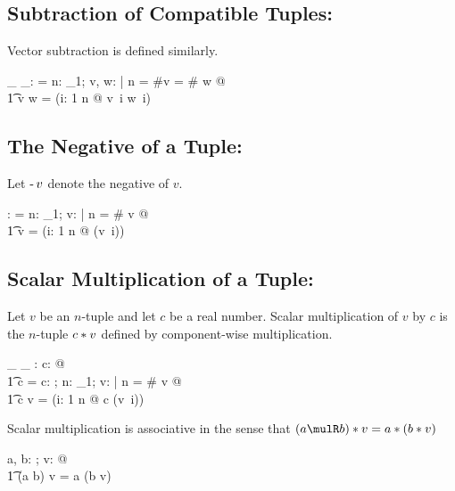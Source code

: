 \documentclass{amsart}
\begin{document}
\subsection{Subtraction of Compatible Tuples: }

Vector subtraction is defined similarly.

\begin{axdef}
	\_ \subRinf \_: \RinfDelta \fun \Rinf
\where
	\langle \rangle \subRinf \langle \rangle = \langle \rangle
\also
\forall n: \nat_1; v, w: \Rinf | n = \#v = \# w @ \\
\t1	v \subRinf w = (\lambda i: 1 \upto n @ v~i \subR w~i)
\end{axdef}

\subsection{The Negative of a Tuple: }

Let $\operatorname{-} v$ denote the negative of $v$.

\begin{axdef}
\negRinf: \Rinf \fun \Rinf
\where
\negRinf \langle \rangle = \langle \rangle
\also
\forall n: \nat_1; v: \Rinf | n = \# v @ \\
\t1	\negRinf v = (\lambda i: 1 \upto n @ \negR(v~i))
\end{axdef}

\subsection{Scalar Multiplication of a Tuple: }

Let $v$ be an $n$-tuple and let $c$ be a real number.
Scalar multiplication of $v$ by $c$ is the $n$-tuple $c \mathbin{*} v$ defined by component-wise multiplication.

\begin{axdef}
\_ \smulRinf \_ : \R \cross \Rinf \fun \Rinf 
\where
\forall c: \R @ \\
\t1	c \smulRinf \langle \rangle = \langle \rangle
\also
\forall c: \R; n: \nat_1; v: \Rinf | n = \# v @ \\
\t1	c \smulRinf v = (\lambda i: 1 \upto n @ c \mulR (v~i))
\end{axdef}

\begin{remark}
Scalar multiplication is associative in the sense that $(a \mulR b) \smulRinf v = a \smulRinf (b \smulRinf v)$

\begin{zed}
	\forall a, b: \R; v: \Rinf @ \\
	\t1	(a \mulR b) \smulRinf v = a \smulRinf (b \smulRinf v)
\end{zed}

\end{remark}
\end{document}

